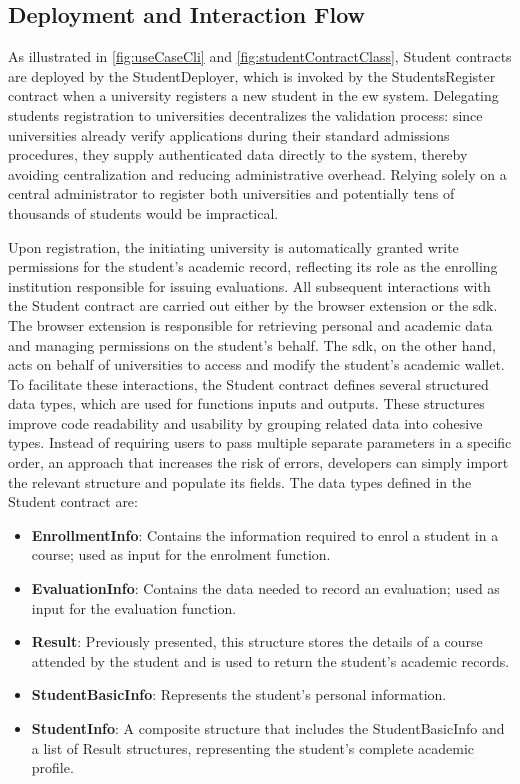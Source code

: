 \subsection{Deployment and Interaction Flow}
As illustrated in \cref{fig:useCaseCli} and \cref{fig:studentContractClass}, Student contracts are deployed by the StudentDeployer, which is invoked by the StudentsRegister contract when a university registers a new student in the \acrshort{ew} system. Delegating students registration to universities decentralizes the validation process: since universities already verify applications during their standard admissions procedures, they supply authenticated data directly to the system, thereby avoiding centralization and reducing administrative overhead. Relying solely on a central administrator to register both universities and potentially tens of thousands of students would be impractical.

Upon registration, the initiating university is automatically granted write permissions for the student's academic record, reflecting its role as the enrolling institution responsible for issuing evaluations. All subsequent interactions with the Student contract are carried out either by the browser extension or the \acrshort{sdk}. The browser extension is responsible for retrieving personal and academic data and managing permissions on the student's behalf. The \acrshort{sdk}, on the other hand, acts on behalf of universities to access and modify the student's academic wallet. To facilitate these interactions, the Student contract defines several structured data types, which are used for functions inputs and outputs. These structures improve code readability and usability by grouping related data into cohesive types. Instead of requiring users to  pass multiple separate parameters in a specific order, an approach that increases the risk of errors, developers can simply import the relevant structure and populate its fields. The data types defined in the Student contract are:

\begin{itemize}
    \item \textbf{EnrollmentInfo}: Contains the information required to enrol a student in a course; used as input for the enrolment function.
    \item \textbf{EvaluationInfo}: Contains the data needed to record an evaluation; used as input for the evaluation function.
    \item \textbf{Result}: Previously presented, this structure stores the details of a course attended by the student and is used to return the student's academic records.
    \item \textbf{StudentBasicInfo}: Represents the student's personal information.
    \item \textbf{StudentInfo}: A composite structure that includes the StudentBasicInfo and a list of Result structures, representing the student’s complete academic profile.
\end{itemize}

